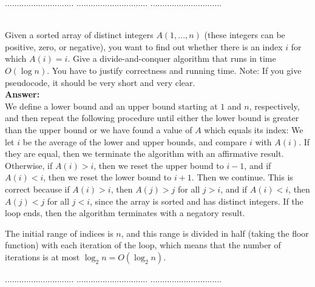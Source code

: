 \documentclass[a4paper,11pt]{article}
\begin{document}
\pagebreak

 $.............................$
 $..............................$
          $..............................$\\

\bigskip

\\
Given a sorted array of distinct integers $A(1,...,n)$ (these integers can be positive, zero, or negative), you want to
find out whether there is an index $ i$ for which $A(i)=i$. 
Give a divide-and-conquer algorithm that runs in time $ O(\log n)$. You have to justify correctness and running time. 
Note: If you give pseudocode, it should be very short and very clear.\\
{\bf Answer:}\\
We define a lower bound and an upper bound starting at $1$ and $n$, respectively, and then repeat the following procedure until either the lower bound is greater than the upper bound or we have found a value of $A$ which equals its index: We let $i$ be the average of the lower and upper bounds, and compare $i$ with $A(i)$. If they are equal, then we terminate the algorithm with an affirmative result. Otherwise, if $A(i) > i$, then we reset the upper bound to $i - 1$, and if $A(i) < i$, then we reset the lower bound to $i + 1$. Then we continue. This is correct because if $A(i) > i$, then $A(j) > j$ for all $j > i$, and if $A(i) < i$, then $A(j) < j$ for all $j < i$, since the array is sorted and has distinct integers. If the loop ends, then the algorithm terminates with a negatory result. \par
The initial range of indices is $n$, and this range is divided in half (taking the floor function) with each iteration of the loop, which means that the number of iterations is at most $\log_2 n = O(\log_2 n)$.
 
\pagebreak

 $.............................$
 $..............................$
          $..............................$\\

\bigskip
\end{document}
